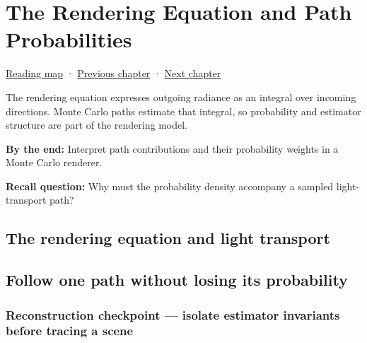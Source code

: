 \chapter{The Rendering Equation and Path Probabilities}\label{03-visual-computing-i-ch007-the-rendering-equation-and-path-probabilities}\hypertarget{03-visual-computing-i-ch007}{}\label{stagechapter:03-visual-computing-i-ch007}

\hypertarget{03-visual-computing-i-ch007-the-rendering-equation-and-path-probabilities}{}

\hyperref[volume-reading-map]{Reading map} · \hyperref[03-visual-computing-i-ch005]{Previous chapter} · \hyperref[03-visual-computing-i-ch008-sampling-directions-and-light-transport]{Next chapter}

The rendering equation expresses outgoing radiance as an integral over incoming directions. Monte Carlo paths estimate that integral, so probability and estimator structure are part of the rendering model.

\textbf{By the end:} Interpret path contributions and their probability weights in a Monte Carlo renderer.

\textbf{Recall question:} Why must the probability density accompany a sampled light-transport path?

\section{The rendering equation and light transport}\label{03-visual-computing-i-ch007-the-rendering-equation-and-light-transport}

\hypertarget{03-visual-computing-i-ch007-the-rendering-equation-and-light-transport}{}

\section{Follow one path without losing its probability}\label{03-visual-computing-i-ch007-follow-one-path-without-losing-its-probability}

\hypertarget{03-visual-computing-i-ch007-follow-one-path-without-losing-its-probability}{}

\subsection{Reconstruction checkpoint --- isolate estimator invariants before tracing a scene}\label{03-visual-computing-i-ch007-reconstruction-checkpoint-isolate-estimator-invariants-before-tracing-a-scene}

